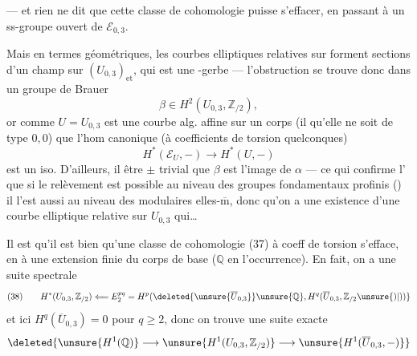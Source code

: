 --- et rien ne dit que cette classe de cohomologie puisse s'effacer, en passant à un ss-groupe ouvert de $\mathcal E_{0,3}$.

Mais en termes géométriques,  les courbes elliptiques relatives  sur  forment  sections d'un champ sur $(U_{0,3})_{\mathrm{et}}$, qui est une -gerbe --- l'obstruction se trouve donc dans un groupe de Brauer
\[
\beta\in H^2(U_{0,3},\mathbb Z_{/2}), \tag{37}
\]
or comme $U=U_{0,3}$ est une courbe alg.  affine sur un corps (il  qu'elle ne soit de type $0,0$)  que l'hom canonique (à coefficients de torsion quelconques)
\[
H^*(\mathcal E_U,-)\longrightarrow H^*(U,-)
\]
est un iso. D'ailleurs, il  être $\pm$ trivial que $\beta$ est l'image de $\alpha$ --- ce qui confirme l' que  si le relèvement est possible au niveau des groupes fondamentaux profinis () il l'est aussi au niveau des  modulaires elles-$\overline{\mathrm m}$, donc qu'on a une existence d'une courbe elliptique relative sur $U_{0,3}$ qui\ldots
{}

Il est  qu'il est bien  qu'une classe de cohomologie (37) à coeff de torsion s'efface, en  à une extension finie du  corps de base ($\mathbb Q$ en l'occurrence). En fait, on a une suite spectrale
\[
(38)\qquad H^*(U_{0,3},\mathbb Z_{/2})
\Longleftarrow E_2^{pq}
=H^p(\deleted{\unsure{\overline U_{0,3}}}\unsure{\mathbb Q},H^q(\overline U_{0,3},\mathbb Z_{/2}\unsure{)|))}
\]
et ici $H^q(\overline U_{0,3})=0$ pour $q\geq 2$, donc on trouve une suite exacte
\[
\deleted{\unsure{H^1(\mathbb Q)}\longrightarrow
\unsure{H^1(U_{0,3},\mathbb Z_{/2})}\longrightarrow
\unsure{H^1(\overline U_{0,3},-)}}
\]

